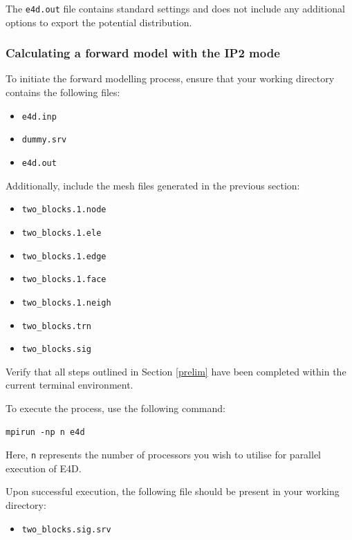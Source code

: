 \documentclass[a4paper,12pt]{article}
\begin{document}
The \texttt{e4d.out} file contains standard settings and does not include any additional options to export the potential distribution.

\subsubsection{Calculating a forward model with the IP2 mode}

To initiate the forward modelling process, ensure that your working directory contains the following files:

\begin{itemize}
    \item \texttt{e4d.inp}
    \item \texttt{dummy.srv}
    \item \texttt{e4d.out}
\end{itemize}

Additionally, include the mesh files generated in the previous section:

\begin{itemize}
    \item \texttt{two\_blocks.1.node}
    \item \texttt{two\_blocks.1.ele}
    \item \texttt{two\_blocks.1.edge}
    \item \texttt{two\_blocks.1.face}
    \item \texttt{two\_blocks.1.neigh}
    \item \texttt{two\_blocks.trn}
    \item \texttt{two\_blocks.sig}
\end{itemize}


Verify that all steps outlined in Section \ref{prelim} have been completed within the current terminal environment.

To execute the process, use the following command:

\begin{verbatim}
mpirun -np n e4d
\end{verbatim}

Here, \texttt{n} represents the number of processors you wish to utilise for parallel execution of E4D.

Upon successful execution, the following file should be present in your working directory:

\begin{itemize}
    \item \texttt{two\_blocks.sig.srv}
\end{itemize}
\end{document}
